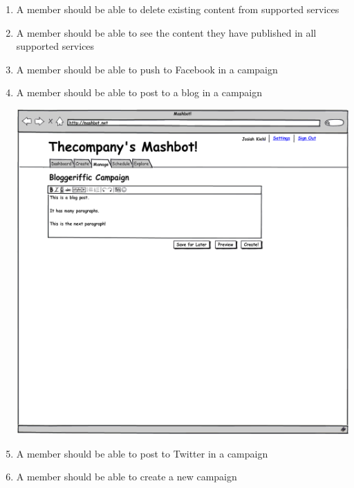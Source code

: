 \documentclass{article}
\begin{document}
\begin{enumerate}
\begin{center}
 \end{center}
\item A member should be able to delete existing content from
  supported services
\item A member should be able to see the content they have published
  in all supported services
\item A member should be able to push to Facebook in a campaign
\item A member should be able to post to a blog in a campaign
\begin{center}
\includegraphics[width=\textwidth]{../mockups/manage-create-blog-post.png}
 \end{center}
\item A member should be able to post to Twitter in a campaign
\item A member should be able to create a new campaign
\begin{center}

\end{center}
\end{enumerate}
\end{document}

